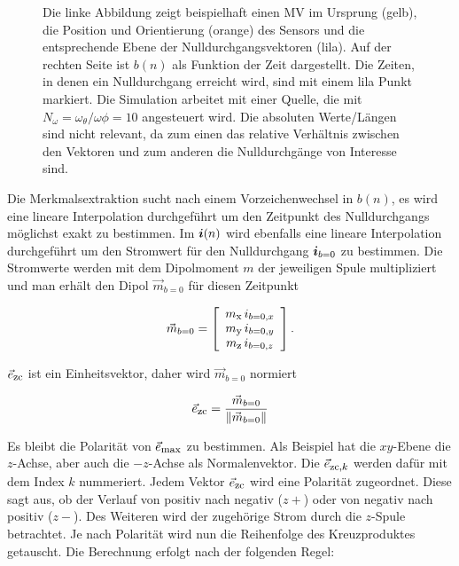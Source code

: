     \begin{figure}[h]
    \centering
    \caption{ Die linke Abbildung zeigt beispielhaft einen MV im Ursprung (gelb), die Position und Orientierung (orange) des Sensors und die entsprechende Ebene der Nulldurchgangsvektoren (lila). Auf der rechten Seite ist $b(n)$ als Funktion der Zeit dargestellt. Die Zeiten, in denen ein Nulldurchgang erreicht wird, sind mit einem lila Punkt markiert. Die Simulation arbeitet mit einer Quelle, die mit $N_\omega=\omega_\theta / \omega\phi = 10$ angesteuert wird. Die absoluten Werte/Längen sind nicht relevant, da zum einen das relative Verhältnis zwischen den Vektoren und zum anderen die Nulldurchgänge von Interesse sind.}
    \label{fig:ZeroCrossingVis}
\end{figure}
Die Merkmalsextraktion sucht nach einem Vorzeichenwechsel in $b(n)$, es wird eine lineare Interpolation durchgeführt um den Zeitpunkt des Nulldurchgangs möglichst exakt zu bestimmen. Im $\mbox{\boldmath ${i}$}(n)$ wird ebenfalls eine lineare Interpolation durchgeführt um den Stromwert für den Nulldurchgang $\mbox{\boldmath ${i}$}_{b=0}$ zu bestimmen. Die Stromwerte werden mit dem Dipolmoment $m$ der jeweiligen Spule multipliziert und man erhält den Dipol $\vec{m}_{b=0}$ für diesen Zeitpunkt

\begin{equation}
    \vec{m}_{b=0} = \left[\begin{array}{c} m_{\textrm{\footnotesize{x}}}\,i_{b=0,x}\\ m_{\textrm{\footnotesize{y}}}\,i_{b=0,y}\\ m_{\textrm{\footnotesize{z}}}\,i_{b=0,z} \end{array}\right].
\end{equation}

$\vec{e}_{\textrm{\footnotesize{zc}}}$ ist ein Einheitsvektor, daher wird $\vec{m}_{b=0}$ normiert

\begin{equation}
    \vec{e}_{\textrm{\footnotesize{zc}}} = \frac{\vec{m}_{b=0}}{\|\vec{m}_{b=0}\|}
\end{equation}


Es bleibt die Polarität von $\vec{e}_{\textrm{\footnotesize{max}}}$ zu bestimmen. Als Beispiel hat die $xy$-Ebene die $z$-Achse, aber auch die $-z$-Achse als Normalenvektor. Die $\vec{e}_{\textrm{\footnotesize{zc,$k$}}}$ werden dafür mit dem Index $k$ nummeriert. Jedem Vektor $\vec{e}_{\textrm{\footnotesize{zc}}}$ wird eine Polarität zugeordnet. Diese sagt aus, ob der Verlauf von positiv nach negativ (${z}+$) oder von negativ nach positiv (${z}-$). Des Weiteren wird der zugehörige Strom durch die $z$-Spule betrachtet. Je nach Polarität wird nun die Reihenfolge des Kreuzproduktes getauscht. Die Berechnung erfolgt nach der folgenden Regel:

